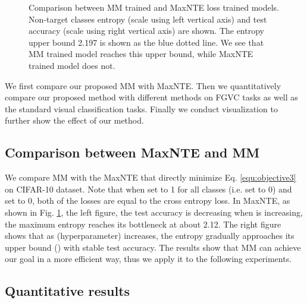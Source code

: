 \documentclass{article}
\theoremstyle{definition}
\begin{document}
\begin{figure}[t]
    \centering
    \hspace{1mm}
    \caption{Comparison between MM trained and MaxNTE loss trained models. Non-target classes entropy (scale using left vertical axis) and test accuracy (scale using right vertical axis) are shown. The entropy upper bound 2.197 is shown as the blue dotted line. We see that MM trained model reaches this upper bound, while MaxNTE trained model does not.}
    \label{fig:comparison with MaxNTE}
\end{figure}

We first compare our proposed MM with MaxNTE. Then we quantitatively compare our proposed method with different methods on FGVC tasks  as well as the standard visual classification tasks. Finally we conduct visualization to further show the effect of our method.

\subsection{Comparison between MaxNTE and MM}
We compare MM with the MaxNTE that directly minimize Eq. \ref{equ:objective3} on CIFAR-10 dataset. Note that when  set to 1 for all classes (i.e.  set to 0) and  set to 0, both of the losses are equal to the cross entropy loss. In MaxNTE, as shown in Fig. \ref{fig:comparison with MaxNTE}, the left figure, the test accuracy is decreasing when  is increasing, the maximum entropy reaches its bottleneck at about 2.12. The right figure shows that as  (hyperparameter) increases, the entropy gradually approaches its upper bound () with stable test accuracy. The results show that MM can achieve our goal in a more efficient way, thus we apply it to the following experiments.

\subsection{Quantitative results}
\end{document}
